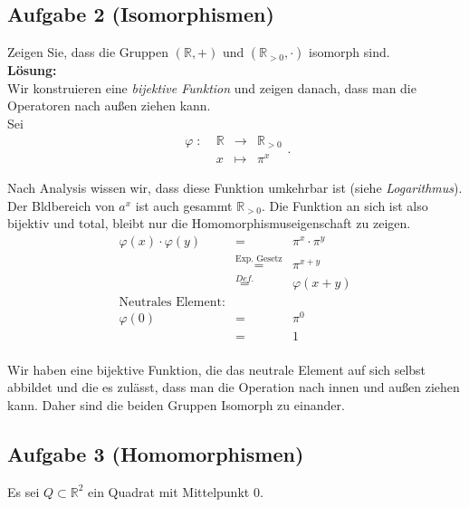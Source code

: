 \documentclass[11pt,a4paper,ngerman]{article}
\newcommand{\R}{\mathbb{R}}
\begin{document}
\pagebreak


\subsection*{Aufgabe 2 \mdseries (Isomorphismen)}

Zeigen Sie, dass die Gruppen $(\R,+)$ und $(\R_{>0},\cdot)$ isomorph sind.\\

\textbf{Lösung:}\\
Wir konstruieren eine \emph{bijektive Funktion} und zeigen danach, dass man die Operatoren nach außen ziehen kann.\\
Sei 
$$
\begin{array}{lrcl}
\varphi \; : \; & \R & \longrightarrow & \R_{>0}\\
& x & \longmapsto & \pi^x
\end{array}.
$$

Nach Analysis wissen wir, dass diese Funktion umkehrbar ist (siehe \emph{Logarithmus}). Der Bldbereich von $a^x$ ist auch gesammt $\R_{>0}$. Die Funktion an sich ist also bijektiv und total, bleibt nur die Homomorphismuseigenschaft zu zeigen.
$$
\begin{array}{rcl}
\varphi (x) \cdot \varphi (y) &=& \pi^{x} \cdot \pi^{y}\\
	&\stackrel{\text{Exp. Gesetz}}{=}& \pi^{x + y}\\
	&\stackrel{Def.}{=}& \varphi(x+y)\\
\text{Neutrales Element:}&&\\
\varphi (0) &=& \pi^0\\
	&=& 1\\
\end{array}
$$

Wir haben eine bijektive Funktion, die das neutrale Element auf sich selbst abbildet und die es zulässt, dass man die Operation nach innen und außen ziehen kann. Daher sind die beiden Gruppen Isomorph zu einander.

\subsection*{Aufgabe 3 \mdseries (Homomorphismen)}
Es sei $Q \subset \R^2$ ein Quadrat mit Mittelpunkt 0.\\
\end{document}
